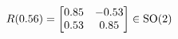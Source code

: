\documentclass[preview]{standalone}
\begin{document}
\begin{align*}
\special{dvisvgm:raw <g id='unique000'>}R(0.56) = \begin{bmatrix} 0.85 & -0.53 \\ 0.53 & 0.85 \end{bmatrix} \in \text{SO}(2)\special{dvisvgm:raw </g>}
\end{align*}
\end{document}
